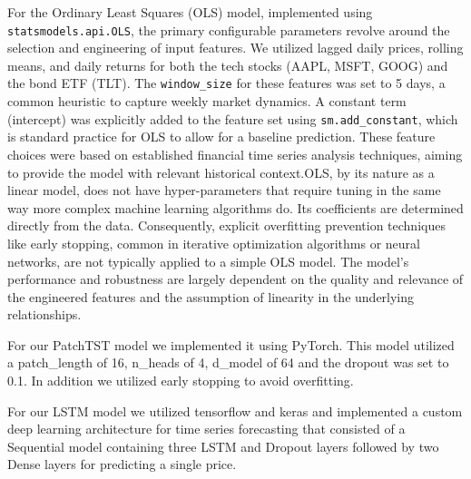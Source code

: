 \documentclass[conference]{IEEEtran}
\begin{document}
For the Ordinary Least Squares (OLS) model, implemented using \verb|statsmodels.api.OLS|, the primary configurable parameters revolve around the selection and engineering of input features. We utilized lagged daily prices, rolling means, and daily returns for both the tech stocks (AAPL, MSFT, GOOG) and the bond ETF (TLT). The \verb|window_size| for these features was set to 5 days, a common heuristic to capture weekly market dynamics. A constant term (intercept) was explicitly added to the feature set using \verb|sm.add_constant|, which is standard practice for OLS to allow for a baseline prediction. These feature choices were based on established financial time series analysis techniques, aiming to provide the model with relevant historical context.OLS, by its nature as a linear model, does not have hyper-parameters that require tuning in the same way more complex machine learning algorithms do. Its coefficients are determined directly from the data. Consequently, explicit overfitting prevention techniques like early stopping, common in iterative optimization algorithms or neural networks, are not typically applied to a simple OLS model. The model's performance and robustness are largely dependent on the quality and relevance of the engineered features and the assumption of linearity in the underlying relationships.

For our PatchTST model we implemented it using PyTorch.  This model utilized a patch\_length of 16, n\_heads of 4, d\_model of 64 and the dropout was set to 0.1.  In addition we utilized early stopping to avoid overfitting.

For our LSTM model we utilized tensorflow and keras and implemented a custom deep learning architecture for time series forecasting that consisted of a Sequential model containing three LSTM and Dropout layers followed by two Dense layers for predicting a single price.
\end{document}
